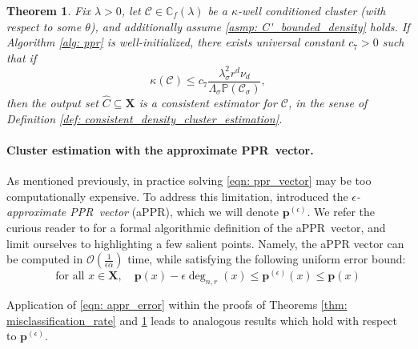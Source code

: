 \documentclass{article}
\newcommand{\1}{\mathbf{1}}
\newcommand{\pbf}{\mathbf{p}}
\newcommand{\Xbf}{\mathbf{X}}
\newcommand{\Pbb}{\mathbb{P}}
\newcommand{\Cbb}{\mathbb{C}}
\newcommand{\Cset}{\mathcal{C}}
\newcommand{\Csig}{\Cset_{\sigma}}
\newcommand{\pprspace}{{\sc PPR~}}
\theoremstyle{aldenthm}
\newtheorem{theorem}{Theorem}
\theoremstyle{aldenrmrk}
\begin{document}
\begin{theorem}
	\label{thm: consistent_recovery_of_density_clusters}
	Fix $\lambda > 0$, let $\Cset \in \Cbb_f(\lambda)$ be a $\kappa$-well conditioned cluster (with respect to some $\theta$), and additionally assume \ref{asmp: C'_bounded_density} holds. If Algorithm \ref{alg: ppr} is well-initialized, there exists universal constant $c_7 > 0$ such that if
	\begin{equation}
	\label{eqn: kappa_ub}
	\kappa(\Cset) \leq c_7 \frac{\lambda_{\sigma}^2r^d \nu_d}{\Lambda_{\sigma}\Pbb(\Csig)},
	\end{equation}
	then the output set $\widehat{C} \subseteq \Xbf$ is a consistent estimator for $\Cset$, in the sense of Definition \ref{def: consistent_density_cluster_estimation}.
\end{theorem}

\paragraph{Cluster estimation with the approximate \pprspace vector.}

As mentioned previously, in practice solving \eqref{eqn: ppr_vector} may be too computationally expensive. To address this limitation, \citet{andersen2006} introduced the \emph{$\epsilon$-approximate \pprspace vector} (aPPR), which we will denote $\pbf^{(\epsilon)}$. We refer the curious reader to \cite{andersen2006} for a formal algorithmic definition of the a\pprspace vector, and limit ourselves to highlighting a few salient points. Namely, the aPPR vector can be computed in $\mathcal{O}\left(\frac{1}{\epsilon \alpha}\right)$ time, while satisfying the following uniform error bound:
\begin{equation}
\label{eqn: appr_error}
\textrm{for all $x \in \Xbf$}, \quad \pbf(x) - \epsilon \deg_{n,r}(x)\leq \pbf^{(\epsilon)}(x) \leq \pbf(x)
\end{equation}

Application of \eqref{eqn: appr_error} within the proofs of Theorems \ref{thm: misclassification_rate} and \ref{thm: consistent_recovery_of_density_clusters} leads to analogous results which hold with respect to $\pbf^{(\epsilon)}$.
\end{document}
